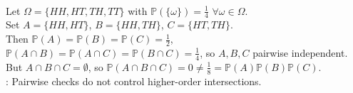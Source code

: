 \begin{example} \label{ex:pairwise-not-mutual-independence-two-tosses} \\
Let $\Omega=\{HH,HT,TH,TT\}$ with $\mathbb{P}(\{\omega\})=\frac{1}{4}$ $\forall \omega\in\Omega$.\\
Set $A=\{HH,HT\}$, $B=\{HH,TH\}$, $C=\{HT,TH\}$.\\
Then $\mathbb{P}(A)=\mathbb{P}(B)=\mathbb{P}(C)=\frac{1}{2}$, $\mathbb{P}(A\cap B)=\mathbb{P}(A\cap C)=\mathbb{P}(B\cap C)=\frac{1}{4}$, so $A,B,C$ pairwise independent.\\
But $A\cap B\cap C=\emptyset$, so $\mathbb{P}(A\cap B\cap C)=0\neq \frac{1}{8}=\mathbb{P}(A)\mathbb{P}(B)\mathbb{P}(C)$.\\
: Pairwise checks do not control higher-order intersections.
\end{example}

